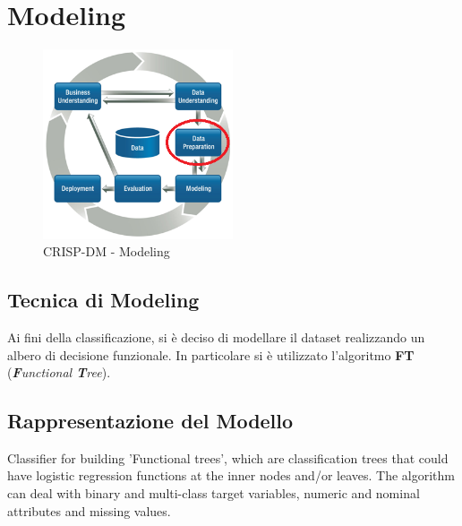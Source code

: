 \chapter{Modeling}

\begin{figure}[hbtp]
	\centering
	\includegraphics[width=0.5\textwidth]{./images/CRISPDM_3.png}
	\caption{CRISP-DM - Modeling}
	\label{CRISPDM_4}
\end{figure}

\section{Tecnica di Modeling}
Ai fini della classificazione, si è deciso di modellare il dataset realizzando un albero di decisione funzionale. In particolare si è utilizzato l'algoritmo \textbf{FT} (\textit{\textbf{F}unctional \textbf{T}ree}).

\section{Rappresentazione del Modello}

Classifier for building 'Functional trees', which are classification trees  that could have logistic regression functions at the inner nodes and/or leaves. The algorithm can deal with binary and multi-class target variables, numeric and nominal attributes and missing values.\cite{Gama2004}

